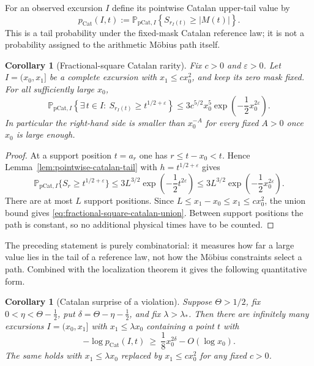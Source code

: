 \documentclass[11pt]{amsart}
\numberwithin{equation}{section}
\theoremstyle{plain}
\newtheorem{corollary}[theorem]{Corollary}
\theoremstyle{definition}
\theoremstyle{remark}
\newcommand{\eps}{\varepsilon}
\begin{document}
For an observed excursion $I$ define its pointwise Catalan upper-tail value
by
\begin{equation}
\label{eq:pointwise-catalan-pvalue}
 p_{\mathrm{Cat}}(I,t):=
 \mathbb P_{\mathrm{pCat},I}
 \left\{S_{r_I(t)}\ge |M(t)|\right\}.
\end{equation}
This is a tail probability under the fixed-mask Catalan reference law; it is
not a probability assigned to the arithmetic M\"obius path itself.

\begin{corollary}[Fractional-square Catalan rarity]
\label{cor:fractional-square-catalan-rarity}
Fix $c>0$ and $\eps>0$.  Let $I=(x_0,x_1]$ be a complete excursion with
$x_1\le cx_0^2$, and keep its zero mask fixed.  For all sufficiently large
$x_0$,
\begin{equation}
\label{eq:fractional-square-catalan-union}
 \mathbb P_{\mathrm{pCat},I}
 \left\{\exists\,t\in I:\ S_{r_I(t)}\ge t^{1/2+\eps}\right\}
 \le 3c^{5/2}x_0^5
 \exp\!\left(-\frac12x_0^{2\eps}\right).
\end{equation}
In particular the right-hand side is smaller than $x_0^{-A}$ for every
fixed $A>0$ once $x_0$ is large enough.
\end{corollary}

\begin{proof}
At a support position $t=a_r$ one has $r\le t-x_0<t$.  Hence
Lemma~\ref{lem:pointwise-catalan-tail} with $h=t^{1/2+\eps}$ gives
\[
 \mathbb P_{\mathrm{pCat},I}\{S_r\ge t^{1/2+\eps}\}
 \le3L^{3/2}\exp\!\left(-\frac12t^{2\eps}\right)
 \le3L^{3/2}\exp\!\left(-\frac12x_0^{2\eps}\right).
\]
There are at most $L$ support positions.  Since
$L\le x_1-x_0\le x_1\le cx_0^2$, the union bound gives
\eqref{eq:fractional-square-catalan-union}.  Between support positions the
path is constant, so no additional physical times have to be counted.
\end{proof}

The preceding statement is purely combinatorial: it measures how far a large
value lies in the tail of a reference law, not how the M\"obius constraints
select a path. Combined with the localization theorem it gives the following
quantitative form.

\begin{corollary}[Catalan surprise of a violation]
\label{cor:catalan-surprise}
Suppose $\Theta>1/2$, fix $0<\eta<\Theta-\frac12$, put
$\delta=\Theta-\eta-\frac12$, and fix $\lambda>\lambda_*$. Then there are
infinitely many excursions $I=(x_0,x_1]$ with $x_1\le\lambda x_0$ containing
a point $t$ with
\begin{equation}
\label{eq:KP-catalan-surprise}
-\log p_{\mathrm{Cat}}(I,t)\ \ge\ \frac18x_0^{2\delta}-O(\log x_0).
\end{equation}
The same holds with $x_1\le\lambda x_0$ replaced by $x_1\le cx_0^2$ for any
fixed $c>0$.
\end{corollary}
\end{document}
